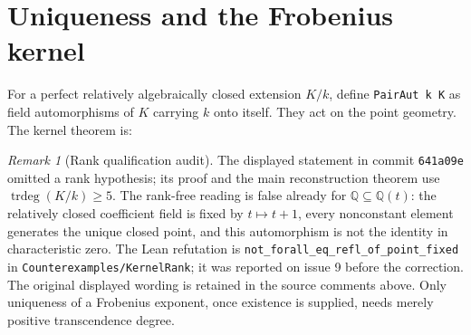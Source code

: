 \documentclass[11pt,oneside]{article}
\newtheorem{theorem}{Theorem}[section]
\theoremstyle{definition}
\theoremstyle{remark}
\newtheorem{remark}[theorem]{Remark}
\newcommand{\trdeg}{\operatorname{trdeg}}
\newcommand{\Frob}{\operatorname{Frob}}
\newcommand{\lean}[1]{\nolinkurl{#1}}
\begin{document}
\section{Uniqueness and the Frobenius kernel}

For a perfect relatively algebraically closed extension $K/k$, define
\lean{PairAut k K} as field automorphisms of $K$ carrying $k$ onto itself.  They act on the
point geometry.  The kernel theorem is:


\begin{remark}[Rank qualification audit]\label{rem:kernel-rank-audit}
The displayed statement in commit \texttt{641a09e} omitted a rank hypothesis;
its proof and the main reconstruction theorem use $\trdeg(K/k)\geq5$.
The rank-free reading is false already for $\mathbb Q\subseteq\mathbb Q(t)$:
the relatively closed coefficient field is fixed by $t\mapsto t+1$, every
nonconstant element generates the unique closed point, and this automorphism
is not the identity in characteristic zero. The Lean refutation is
\lean{not_forall_eq_refl_of_point_fixed} in \lean{Counterexamples/KernelRank};
it was reported on issue 9 before the correction. The original displayed wording
is retained in the source comments above.
Only uniqueness of a Frobenius exponent, once existence is supplied, needs
merely positive transcendence degree.
\end{remark}
\end{document}
